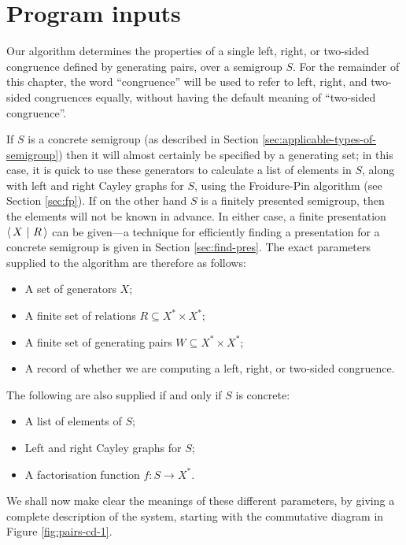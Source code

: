 \section{Program inputs}
\label{sec:program-inputs}

Our algorithm determines the properties of a single left, right, or two-sided
congruence defined by generating pairs, over a semigroup $S$.
For the remainder of this chapter, the word ``congruence'' will be used to refer
to left, right, and two-sided congruences equally, without having the default
meaning of ``two-sided congruence''. %

If $S$ is a concrete semigroup (as described in Section
\ref{sec:applicable-types-of-semigroup}) then it will almost certainly be
specified by a generating set; in this case, it is quick to use these generators
to calculate a list of elements in $S$, along with left and right Cayley graphs
for $S$, using the Froidure-Pin algorithm (see Section \ref{sec:fp}).  If on the
other hand $S$ is a finitely presented semigroup, then the elements will not be
known in advance.  In either case, a finite presentation $\left\langle\,X ~\middle|~ R\,\right\rangle$ can be
given---a technique for efficiently finding a presentation for a concrete
semigroup is given in Section \ref{sec:find-pres}.
The exact parameters supplied to the algorithm are therefore as follows:
\begin{itemize}
\item A set of generators $X$;
\item A finite set of relations $R \subseteq X^* \times X^*$;
\item A finite set of generating pairs $W \subseteq X^* \times X^*$;
\item A record of whether we are computing a left, right, or two-sided
  congruence.
\end{itemize}
The following are also supplied if and only if $S$ is concrete:
\begin{itemize}
\item A list of elements of $S$;
\item Left and right Cayley graphs for $S$;
\item A factorisation function $f : S \to X^*$.
\end{itemize}

We shall now make clear the meanings of these different parameters, by giving a
complete description of the system, starting with the commutative diagram in
Figure \ref{fig:pairs-cd-1}.

